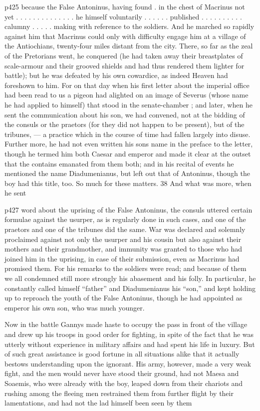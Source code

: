 p425 because the False Antoninus, having found . in the chest of Macrinus not yet . . . . . . . . . . . . . . he himself voluntarily . . . . . . published . . . . . . . . . . calumny . . . . . making with reference to the soldiers. And he marched so rapidly against him that Macrinus could only with difficulty engage him at a village of the Antiochians, twenty-four miles distant from the city. There, so far as the zeal of the Pretorians went, he conquered (he had taken away their breastplates of scale-armour and their grooved shields and had thus rendered them lighter for battle); but he was defeated by his own cowardice, as indeed Heaven had foreshown to him. For on that day when his first letter about the imperial office had been read to us a pigeon had alighted on an image of Severus (whose name he had applied to himself) that stood in the senate-chamber ; and later, when he sent the communication about his son, we had convened, not at the bidding of the consuls or the praetors (for they did not happen to be present), but of the tribunes, \texthebrew{—} a practice which in the course of time had fallen largely into disuse. Further more, he had not even written his sons name in the preface to the letter, though he termed him both Caesar and emperor and made it clear at the outset that the contains emanated from them both; and in his recital of events he mentioned the name Diadumenianus, but left out that of Antoninus, though the boy had this title, too. So much for these matters. 38
And what was more, when he sent

p427 word about the uprising of the False Antoninus, the consuls uttered certain formulae against the usurper, as is regularly done in such cases, and one of the praetors and one of the tribunes did the same. War was declared and solemnly proclaimed against not only the usurper and his cousin but also against their mothers and their grandmother, and immunity was granted to those who had joined him in the uprising, in case of their submission, even as Macrinus had promised them. For his remarks to the soldiers were read; and because of them we all condemned still more strongly his abasement and his folly. In particular, he constantly called himself ``father'' and Diadumenianus his ``son,'' and kept holding up to reproach the youth of the False Antoninus, though he had appointed as emperor his own son, who was much younger.

Now in the battle Gannys made haste to occupy the pass in front of the village and drew up his troops in good order for fighting, in spite of the fact that he was utterly without experience in military affairs and had spent his life in luxury. But of such great assistance is good fortune in all situations alike that it actually bestows understanding upon the ignorant. His army, however, made a very weak fight, and the men would never have stood their ground, had not Maesa and Soaemis, who were already with the boy, leaped down from their chariots and rushing among the fleeing men restrained them from further flight by their lamentations, and had not the lad himself been seen by them

